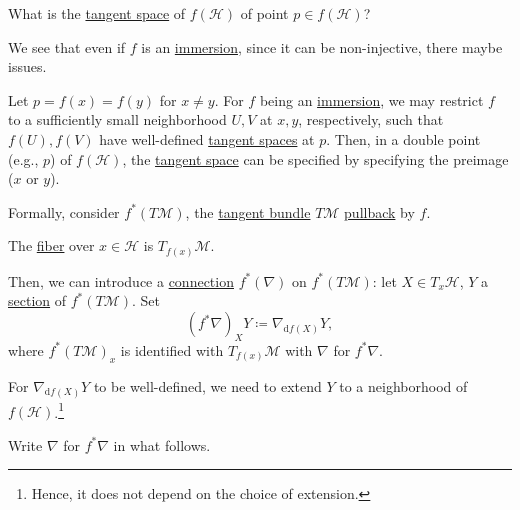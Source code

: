 \begin{problem}
What is the \hyperref[def:tangent-space]{tangent space} of \(f(\mathcal{H} )\) of point \(p\in f(\mathcal{H} )\)?
\end{problem}

We see that even if \(f\) is an \hyperref[def:immersion]{immersion}, since it can be non-injective, there maybe issues.

\begin{eg}
	Let \(p = f(x) = f(y)\) for \(x \neq y\). For \(f\) being an \hyperref[def:immersion]{immersion}, we may restrict \(f\) to a sufficiently small neighborhood \(U, V\) at \(x, y\), respectively, such that \(f(U), f(V)\) have well-defined \hyperref[def:tangent-space]{tangent spaces} at \(p\). Then, in a double point (e.g., \(p\)) of \(f(\mathcal{H} )\), the \hyperref[def:tangent-space]{tangent space} can be specified by specifying the preimage (\(x\) or \(y\)).
\end{eg}

Formally, consider \(f^{\ast} (T \mathcal{M} )\), the \hyperref[def:tangent-bundle]{tangent bundle} \(T \mathcal{M} \) \hyperref[def:pullback-bundle]{pullback} by \(f\).

\begin{note}
	The \hyperref[def:fiber]{fiber} over \(x\in \mathcal{H} \) is \(T_{f(x)} \mathcal{M} \).
\end{note}

Then, we can introduce a \hyperref[def:linear-connection]{connection} \(f^{\ast} (\nabla )\) on \(f^{\ast} (T \mathcal{M} )\): let \(X\in T_x \mathcal{H} \), \(Y\) a \hyperref[def:section]{section} of \(f^{\ast} (T \mathcal{M} )\). Set
\[
	(f^{\ast} \nabla )_X Y\coloneqq \nabla _{\mathrm{d} f(X)} Y,
\]
where \(f^{\ast} (T \mathcal{M} )_x\) is identified with \(T_{f(x)}\mathcal{M} \) with \(\nabla \) for \(f^{\ast} \nabla \).

\begin{note}
	For \(\nabla _{\mathrm{d} f(X)}Y\) to be well-defined, we need to extend \(Y\) to a neighborhood of \(f(\mathcal{H} )\).\footnote{Hence, it does not depend on the choice of extension.}
\end{note}

\begin{notation}
	Write \(\nabla \) for \(f^{\ast} \nabla \) in what follows.
\end{notation}

